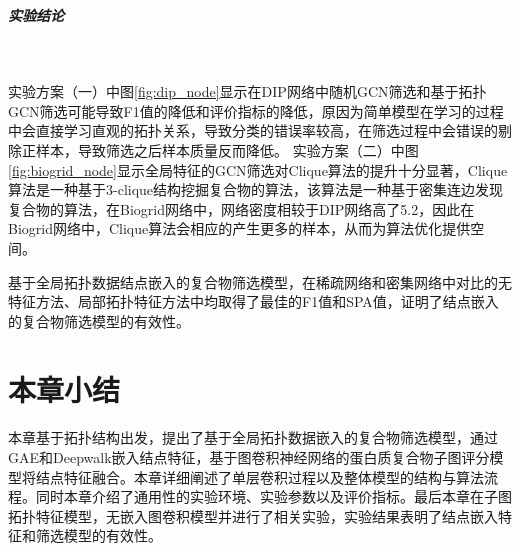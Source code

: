 \subparagraph*{实验结论} ~

实验方案（一）中图\ref{fig:dip_node}显示在DIP网络中随机GCN筛选和基于拓扑GCN筛选可能导致F1值的降低和评价指标的降低，原因为简单模型在学习的过程中会直接学习直观的拓扑关系，导致分类的错误率较高，在筛选过程中会错误的剔除正样本，导致筛选之后样本质量反而降低。
实验方案（二）中图\ref{fig:biogrid_node}显示全局特征的GCN筛选对Clique算法的提升十分显著，Clique算法是一种基于3-clique结构挖掘复合物的算法，该算法是一种基于密集连边发现复合物的算法，在Biogrid网络中，网络密度相较于DIP网络高了5.2，因此在Biogrid网络中，Clique算法会相应的产生更多的样本，从而为算法优化提供空间。

基于全局拓扑数据结点嵌入的复合物筛选模型，在稀疏网络和密集网络中对比的无特征方法、局部拓扑特征方法中均取得了最佳的F1值和SPA值，证明了结点嵌入的复合物筛选模型的有效性。

\section{本章小结}
\label{section:NodeConv:summary}

本章基于拓扑结构出发，提出了基于全局拓扑数据嵌入的复合物筛选模型，通过GAE和Deepwalk嵌入结点特征，基于图卷积神经网络的蛋白质复合物子图评分模型将结点特征融合。本章详细阐述了单层卷积过程以及整体模型的结构与算法流程。同时本章介绍了通用性的实验环境、实验参数以及评价指标。最后本章在子图拓扑特征模型，无嵌入图卷积模型并进行了相关实验，实验结果表明了结点嵌入特征和筛选模型的有效性。
